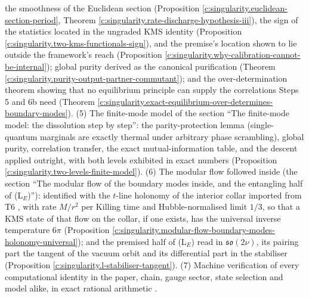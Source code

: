 \documentclass[11pt]{article}
\theoremstyle{definition}
\theoremstyle{plain}
\begin{document}
the smoothness of the Euclidean section (Proposition \ref{c:singularity.euclidean-section-period}, Theorem \ref{c:singularity.rate-discharge-hypothesis-iii}), the sign of the statistics located in the ungraded KMS identity (Proposition \ref{c:singularity.two-kms-functionals-sign}), and the premise's location shown to lie outside the framework's reach (Proposition \ref{c:singularity.why-calibration-cannot-be-internal}); global purity derived as the canonical purification (Theorem \ref{c:singularity.purity-output-partner-commutant}); and the over-determination theorem showing that no equilibrium principle can supply the correlations Steps 5 and 6b need (Theorem \ref{c:singularity.exact-equilibrium-over-determines-boundary-modes}). (5) The finite-mode model of the section ``The finite-mode model: the dissolution step by step'': the parity-protection lemma (single-quantum marginals are exactly thermal under arbitrary phase scrambling), global purity, correlation transfer, the exact mutual-information table, and the descent applied outright, with both levels exhibited in exact numbers (Proposition \ref{c:singularity.two-levels-finite-model}). (6) The modular flow followed inside (the section ``The modular flow of the boundary modes inside, and the entangling half of (L$_E$)''): identified with the $t$-line holonomy of the interior collar imported from T6 \cite{ButlerT6}, with rate $M/r^2$ per Killing time and Hubble-normalised limit $1/3$, so that a KMS state of that flow on the collar, if one exists, has the universal inverse temperature $6\pi$ (Proposition \ref{c:singularity.modular-flow-boundary-modes-holonomy-universal}); and the premised half of (L$_E$) read in $\mathfrak{so}(2\nu)$, its pairing part the tangent of the vacuum orbit and its differential part in the stabiliser (Proposition \ref{c:singularity.l-stabiliser-tangent}). (7) Machine verification of every computational identity in the paper, chain, gauge sector, state selection and model alike, in exact rational arithmetic \cite{ButlerVerifyT05}.
\end{document}
